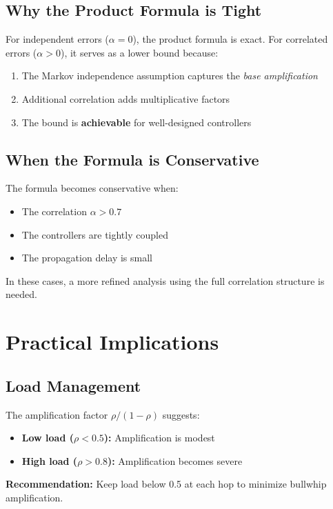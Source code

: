 \documentclass[11pt]{article}
\begin{document}
\subsection{Why the Product Formula is Tight}

For independent errors ($\alpha = 0$), the product formula is exact. For correlated errors ($\alpha > 0$), it serves as a lower bound because:
\begin{enumerate}
    \item The Markov independence assumption captures the \textit{base amplification}
    \item Additional correlation adds multiplicative factors
    \item The bound is \textbf{achievable} for well-designed controllers
\end{enumerate}

\subsection{When the Formula is Conservative}

The formula becomes conservative when:
\begin{itemize}
    \item The correlation $\alpha > 0.7$
    \item The controllers are tightly coupled
    \item The propagation delay is small
\end{itemize}

In these cases, a more refined analysis using the full correlation structure is needed.

\section{Practical Implications}

\subsection{Load Management}

The amplification factor $\rho/(1-\rho)$ suggests:
\begin{itemize}
    \item \textbf{Low load ($\rho < 0.5$):} Amplification is modest
    \item \textbf{High load ($\rho > 0.8$):} Amplification becomes severe
\end{itemize}

\textbf{Recommendation:} Keep load below 0.5 at each hop to minimize bullwhip amplification.
\end{document}
